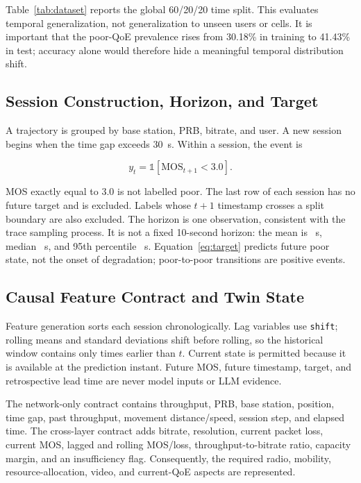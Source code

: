 \documentclass[10pt,conference]{IEEEtran}
\newcommand{\mos}{\mathrm{MOS}}
\begin{document}
\begin{table}[t]
\caption{Chronological dataset partitions}
\label{tab:dataset}
\centering
\resizebox{\columnwidth}{!}{}
\end{table}

Table~\ref{tab:dataset} reports the global 60/20/20 time split.  This evaluates
temporal generalization, not generalization to unseen users or cells.  It is
important that the poor-QoE prevalence rises from 30.18\% in training to
41.43\% in test; accuracy alone would therefore hide a meaningful temporal
distribution shift.

\subsection{Session Construction, Horizon, and Target}

A trajectory is grouped by base station, PRB, bitrate, and user.  A new session
begins when the time gap exceeds 30~s.  Within a session, the event is

\begin{equation}
y_t = \mathbb{1}\!\left[\mos_{t+1} < 3.0\right].
\label{eq:target}
\end{equation}

MOS exactly equal to 3.0 is not labelled poor.  The last row of each session
has no future target and is excluded.  Labels whose $t+1$ timestamp crosses a
split boundary are also excluded.  The horizon is one observation, consistent
with the trace sampling process.  It is not a fixed 10-second horizon: the
mean is \MeanLead~s, median \MedianLead~s, and 95th percentile
\PninetyfiveLead~s.  Equation~\ref{eq:target} predicts future poor state, not
the onset of degradation; poor-to-poor transitions are positive events.

\subsection{Causal Feature Contract and Twin State}

Feature generation sorts each session chronologically.  Lag variables use
\texttt{shift}; rolling means and standard deviations shift before rolling, so
the historical window contains only times earlier than $t$.  Current state is
permitted because it is available at the prediction instant.  Future MOS,
future timestamp, target, and retrospective lead time are never model inputs or
LLM evidence.

The network-only contract contains throughput, PRB, base station, position,
time gap, past throughput, movement distance/speed, session step, and elapsed
time.  The cross-layer contract adds bitrate, resolution, current packet loss,
current MOS, lagged and rolling MOS/loss, throughput-to-bitrate ratio, capacity
margin, and an insufficiency flag.  Consequently, the required radio,
mobility, resource-allocation, video, and current-QoE aspects are represented.
\end{document}
